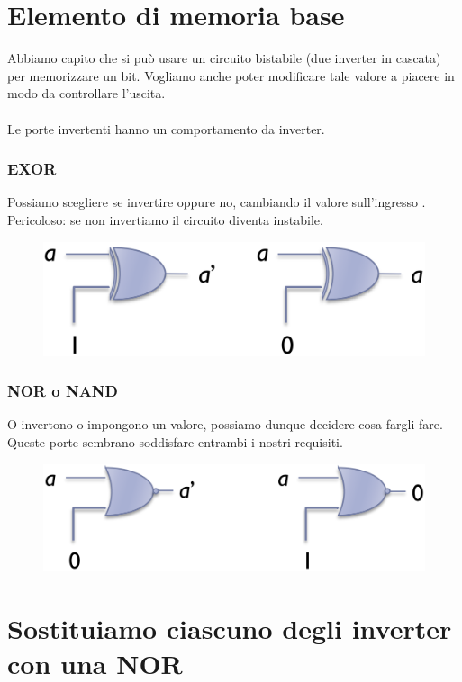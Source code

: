 \section{Elemento di memoria base}

Abbiamo capito che si può usare un circuito bistabile (due inverter in cascata) per memorizzare un bit. Vogliamo anche poter modificare tale valore a piacere in modo da controllare l'uscita.
\paragraph{}

Le porte invertenti hanno un comportamento da inverter.

\subsubsection{EXOR}

Possiamo scegliere se invertire oppure no, cambiando il valore sull'ingresso . Pericoloso: se non invertiamo il circuito diventa instabile.

\begin{figure}[htbp]
    \centering
    \includegraphics[width=0.5\linewidth]{img/EXOR.png}    
    
\end{figure}

\subsubsection{NOR o NAND}
O invertono o impongono un valore, possiamo dunque decidere cosa fargli fare. Queste porte sembrano soddisfare entrambi i nostri requisiti.

\begin{figure}[htbp]
    \centering
    \includegraphics[width=0.5\linewidth]{img/XNOR.png}    
\end{figure}

\newpage
\section{Sostituiamo ciascuno degli inverter con una NOR}

